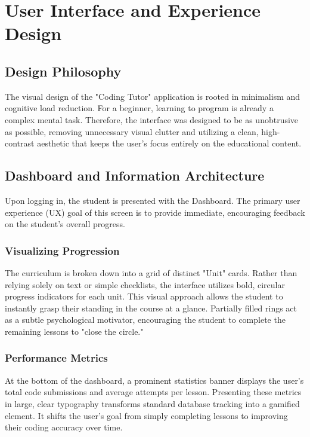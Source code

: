 \documentclass[12pt]{report}
\begin{document}
\chapter{User Interface and Experience Design}
\label{ch:ui_ux_design}

\section{Design Philosophy}
The visual design of the "Coding Tutor" application is rooted in minimalism and cognitive load reduction. For a beginner, learning to program is already a complex mental task. Therefore, the interface was designed to be as unobtrusive as possible, removing unnecessary visual clutter and utilizing a clean, high-contrast aesthetic that keeps the user's focus entirely on the educational content.

\section{Dashboard and Information Architecture}
Upon logging in, the student is presented with the Dashboard. The primary user experience (UX) goal of this screen is to provide immediate, encouraging feedback on the student's overall progress.

\subsection{Visualizing Progression}
The curriculum is broken down into a grid of distinct "Unit" cards. Rather than relying solely on text or simple checklists, the interface utilizes bold, circular progress indicators for each unit. This visual approach allows the student to instantly grasp their standing in the course at a glance. Partially filled rings act as a subtle psychological motivator, encouraging the student to complete the remaining lessons to "close the circle."

\subsection{Performance Metrics}
At the bottom of the dashboard, a prominent statistics banner displays the user's total code submissions and average attempts per lesson. Presenting these metrics in large, clear typography transforms standard database tracking into a gamified element. It shifts the user's goal from simply completing lessons to improving their coding accuracy over time.
\end{document}
